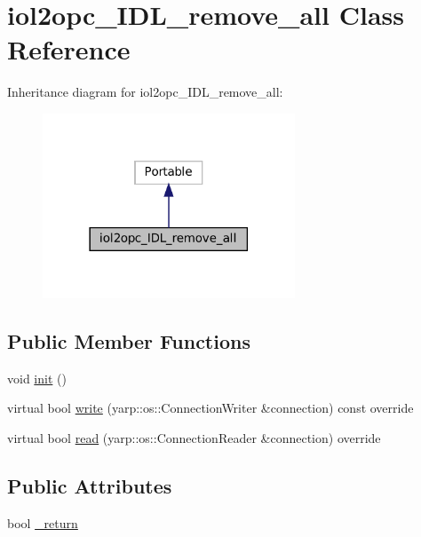 \hypertarget{classiol2opc__IDL__remove__all}{}\section{iol2opc\+\_\+\+I\+D\+L\+\_\+remove\+\_\+all Class Reference}
\label{classiol2opc__IDL__remove__all}


Inheritance diagram for iol2opc\+\_\+\+I\+D\+L\+\_\+remove\+\_\+all\+:
\nopagebreak
\begin{figure}[H]
\begin{center}
\leavevmode
\includegraphics[width=213pt]{classiol2opc__IDL__remove__all__inherit__graph}
\end{center}
\end{figure}
\subsection*{Public Member Functions}
\begin{DoxyCompactItemize}
\item 
void \hyperlink{classiol2opc__IDL__remove__all_a9390266caed32e6cefd21a040f260031}{init} ()
\item 
virtual bool \hyperlink{classiol2opc__IDL__remove__all_a3983e57c2d1d0b6020fdc8d7c829b695}{write} (yarp\+::os\+::\+Connection\+Writer \&connection) const override
\item 
virtual bool \hyperlink{classiol2opc__IDL__remove__all_afd238b5574b40b09c022b6c706070646}{read} (yarp\+::os\+::\+Connection\+Reader \&connection) override
\end{DoxyCompactItemize}
\subsection*{Public Attributes}
\begin{DoxyCompactItemize}
\item 
bool \hyperlink{classiol2opc__IDL__remove__all_a7af589782057ac11123c5b56d07bac7b}{\+\_\+return}
\end{DoxyCompactItemize}


